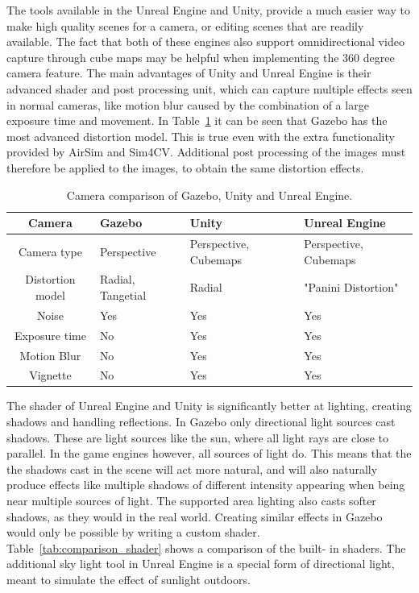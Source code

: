 The tools available in the Unreal Engine and Unity, provide a much easier way to make high quality scenes for a camera, or editing scenes that are readily available. The fact that both of these engines also support omnidirectional video capture through cube maps may be helpful when implementing the 360 degree camera feature. The main advantages of Unity and Unreal Engine is their advanced shader and post processing unit, which can capture multiple effects seen in normal cameras, like motion blur caused by the combination of a large exposure time and movement. In Table~\ref{tab:comparison_camera} it can be seen that Gazebo has the most advanced distortion model. This is true even with the extra functionality provided by AirSim and Sim4CV. Additional post processing of the images must therefore be applied to the images, to obtain the same distortion effects.

\begin{table}[!htb]
    \centering
    \caption{Camera comparison of Gazebo, Unity and Unreal Engine.}
    \label{tab:comparison_camera}
    \begin{tabular}{|c|>{\centering\arraybackslash}m{4cm}|>{\centering\arraybackslash}m{4cm}|>{\centering\arraybackslash}m{4cm}|} \hline
        \textbf{Camera} & \textbf{Gazebo} & \textbf{Unity} & \textbf{Unreal Engine} \\ \hline\hline
        Camera type     & Perspective & Perspective, Cubemaps & Perspective, Cubemaps \\ \hline
        Distortion model & Radial, Tangetial & Radial  & "Panini Distortion"\cite{panini} \\ \hline
        Noise           & Yes & Yes & Yes \\ \hline
        Exposure time   & No & Yes & Yes \\ \hline
        Motion Blur     & No & Yes & Yes \\ \hline
        Vignette        & No & Yes & Yes \\ \hline
        
    \end{tabular}
\end{table}

The shader of Unreal Engine and Unity is significantly better at lighting, creating shadows and handling reflections. In Gazebo only directional light sources cast shadows. These are light sources like the sun, where all light rays are close to parallel. In the game engines however, all sources of light do. This means that the the shadows cast in the scene will act more natural, and will also naturally produce effects like multiple shadows of different intensity appearing when being near multiple sources of light. The supported area lighting also casts softer shadows, as they would in the real world. Creating similar effects in Gazebo would only be possible by writing a custom shader. Table~\ref{tab:comparison_shader} shows a comparison of the built- in shaders. The additional sky light tool in Unreal Engine is a special form of directional light, meant to simulate the effect of sunlight outdoors.

